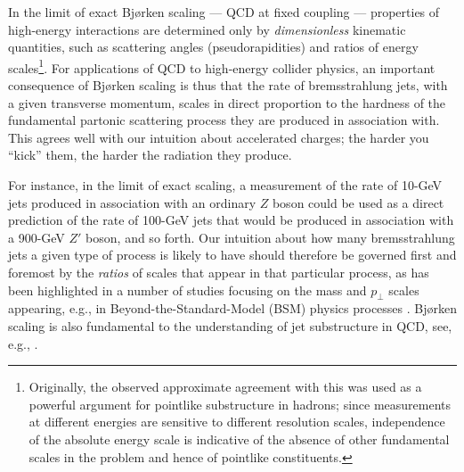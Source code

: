 %
In the limit of exact Bj{\o}rken scaling --- QCD at fixed coupling
--- properties of high-energy interactions are determined 
only by \emph{dimensionless} kinematic quantities, such as scattering
angles (pseudorapidities) and ratios of energy
scales\footnote{Originally, the observed approximate agreement with
this was used as a powerful argument
for pointlike substructure in hadrons; since measurements at different
energies are sensitive to different resolution scales, independence of the absolute
energy scale is indicative of the absence of other fundamental
scales in the problem and hence of pointlike constituents.}.
For applications of QCD to high-energy collider physics, an important
consequence of Bj{\o}rken scaling is thus that the rate of 
%
bremsstrahlung
jets, with a given transverse momentum, scales in direct proportion to
the hardness 
of the fundamental partonic scattering process they are produced in
association with. This agrees well with our intuition about accelerated
charges; the harder you ``kick'' them, the harder the radiation they
produce.  

For instance, in the limit of exact scaling, a
measurement of the rate of 10-GeV jets produced in association with an
ordinary $Z$ 
boson could be used as a direct prediction of the rate of 100-GeV jets
that would be 
produced in association with a 900-GeV $Z'$ boson, and so 
forth. Our intuition about how many bremsstrahlung jets a given type of
process is likely to have should therefore be governed first and
foremost by the \emph{ratios} of scales that appear in that particular
process, as has been  highlighted in a number of studies focusing on
the mass and $p_\perp$ scales appearing, e.g., in
Beyond-the-Standard-Model (BSM) 
physics processes
\cite{Plehn:2005cq,Alwall:2008qv,Papaefstathiou:2009hp,Krohn:2011zp}. 
Bj{\o}rken scaling 
is also fundamental to the understanding of jet substructure in QCD, see, e.g.,
\cite{Vermilion:2011nm,Altheimer:2012mn}.  

